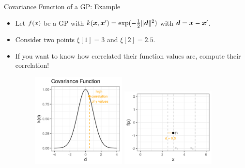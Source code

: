 \begin{frame}{Covariance Function of a GP: Example} 

\begin{itemize}
  \item Let $f(x)$ be a GP with $k(\bm{x}, \bm{x}^\prime) = \exp(-\frac{1}{2}\|\bm{d}\|^2)$ with $\bm{d} = \bm{x} - \bm{x}^\prime$.
  \item Consider two points $\xi[1] = 3$ and $\xi[2] = 2.5$. 
  \item If you want to know how correlated their function values are, compute their correlation!
    \begin{figure}
      \includegraphics[width=0.45\textwidth]{figure_man/covariance2point/example_covariance_1.png}
      \includegraphics[width=0.45\textwidth]{figure_man/covariance2point/example_function_1-1.png}
    \end{figure}
\end{itemize}

\end{frame}

